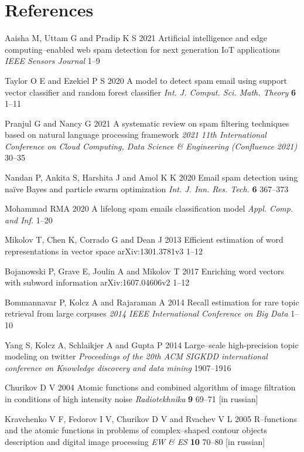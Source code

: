 \documentclass[a4paper]{jpconf}
\begin{document}
\section*{References}
\begin{thebibliography}{99}
Aaisha M, Uttam G and Pradip K S
2021 {Artificial intelligence and edge computing--enabled
web spam detection for next generation IoT
applications} {\it IEEE Sensors Journal} {\bf } 1--9

Taylor O E and Ezekiel P S
2020 {A model to detect spam email using support vector classifier and random forest classifier} 
\emph{Int. J. Comput. Sci. Math. Theory} {\bf 6} 1--11

Pranjul G and Nancy G
2021 {A systematic review on spam filtering techniques based on
natural language processing framework} \emph{2021 11th International Conference on Cloud Computing, Data Science \& Engineering (Confluence 2021)} 30--35

Nandan P, Ankita S, Harshita J and Amol K K
2020 {Email spam detection using naïve Bayes and particle swarm optimization} \emph{Int. J. Inn. Res. Tech.} {\bf 6} 367--373

Mohammad RMA
2020 {A lifelong spam emails classification model}
\emph{Appl. Comp. and Inf.} 1--20

Mikolov T, Chen K, Corrado G and Dean J
2013 {Efficient estimation of word representations in vector space} 
arXiv:1301.3781v3 1--12

Bojanowski P, Grave E, Joulin A and Mikolov T
2017 {Enriching word vectors with subword information} 
arXiv:1607.04606v2 1--12

Bommannavar P, Kolcz A and Rajaraman A
2014 {Recall estimation for rare topic retrieval from large corpuses}
\emph{2014 IEEE International Conference on Big Data} 1--10

Yang S, Kolcz A, Schlaikjer A and Gupta P
2014 {Large--scale high-precision topic modeling on twitter} 
\emph{Proceedings of the 20th ACM SIGKDD international conference on Knowledge discovery and data mining} 1907--1916

 Churikov D V 2004
{Atomic functions and combined algorithm of image filtration in conditions of high intensity noise}
\emph{Radiotekhnika} \textbf{9} 69--71 [in russian]

Kravchenko V F, Fedorov I V, Churikov D V and Rvachev V L 2005 
{R--functions and the atomic functions in problems of complex--shaped contour objects description and digital image processing}
\emph{EW \& ES} \textbf{10} 70--80 [in russian]
\end{thebibliography}
\end{document}
